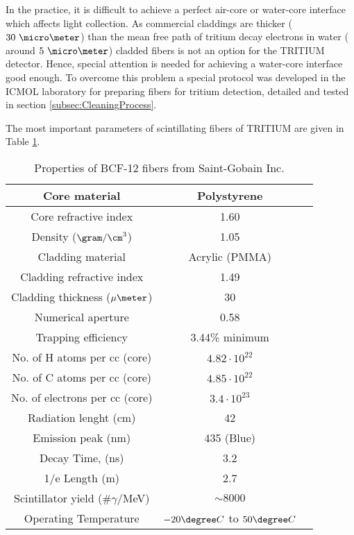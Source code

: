 In the practice, it is difficult to achieve a perfect air-core or water-core interface which affects light collection. As commercial claddings are thicker ($30~\micro \meter$) than the mean free path of tritium decay electrons in water ( around $5~\micro\meter$) cladded fibers is not an option for the TRITIUM detector. Hence, special attention is needed for achieving a water-core interface good enough. To overcome this problem a special protocol was developed in the ICMOL laboratory for preparing fibers for tritium detection, detailed and tested in section \ref{subsec:CleaningProcess}.

The most important parameters of scintillating fibers of TRITIUM are given in Table \ref{tab:ParametersFibersBCF12}.

\begin{table}[h]
\begin{center}
\begin{tabular}{|c|c|c|}
\hline \hline 
Core material & Polystyrene \\ \hline
Core refractive index & 1.60 \\ \hline
Density ($\gram/\cm^3$) & 1.05 \\ \hline
Cladding material & Acrylic (PMMA) \\ \hline
Cladding refractive index & 1.49 \\ \hline
Cladding thickness ($\mu\meter$) & 30 \\ \hline
Numerical aperture & 0.58 \\ \hline
Trapping efficiency & 3.44\% minimum \\ \hline
No. of H atoms per cc (core) & $4.82 \cdot{} 10^{22}$ \\ \hline
No. of C atoms per cc (core) & $4.85 \cdot{} 10^{22}$ \\ \hline
No. of electrons per cc (core) & $3.4 \cdot{} 10^{23}$ \\ \hline
Radiation lenght (cm) & 42 \\ \hline
Emission peak (nm) & 435 (Blue) \\ \hline
Decay Time, (ns) & 3.2 \\ \hline
1/e Length (m) & 2.7 \\ \hline
Scintillator yield (\#$\gamma$/MeV) & $\sim 8000$ \\ \hline
Operating Temperature & $-20\degree C$ to $50\degree C$ \\ \hline
\end{tabular}
\caption{Properties of BCF-12 fibers from Saint-Gobain Inc. \cite{DataSheetBCF12Fiber}}
\label{tab:ParametersFibersBCF12}
\end{center}
\end{table}


